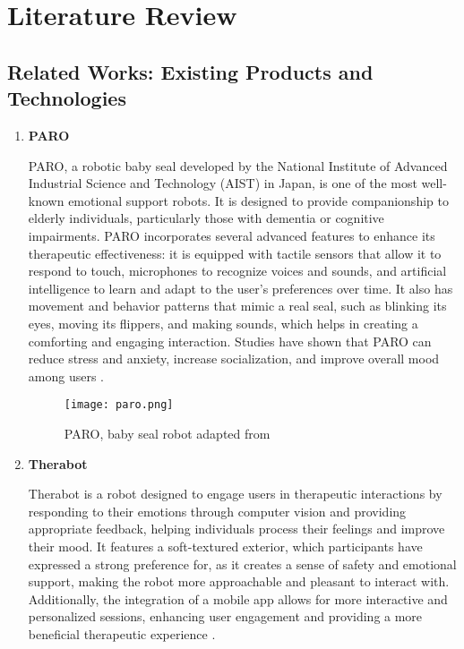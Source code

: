 \section{Literature Review}

\subsection{Related Works: Existing Products and Technologies}

\begin{enumerate}


\item{\bf{PARO}}
\vspace{0.25cm}

PARO, a robotic baby seal developed by the National Institute of Advanced Industrial Science and Technology (AIST) in Japan, is one of the most well-known emotional support robots. It is designed to provide companionship to elderly individuals, particularly those with dementia or cognitive impairments. PARO incorporates several advanced features to enhance its therapeutic effectiveness: it is equipped with tactile sensors that allow it to respond to touch, microphones to recognize voices and sounds, and artificial intelligence to learn and adapt to the user’s preferences over time. It also has movement and behavior patterns that mimic a real seal, such as blinking its eyes, moving its flippers, and making sounds, which helps in creating a comforting and engaging interaction. Studies have shown that PARO can reduce stress and anxiety, increase socialization, and improve overall mood among users \cite{wada2006}.

\begin{figure}[ht]
    \centering
    \texttt{[image: paro.png]}
    \caption{PARO, baby seal robot adapted from \cite{shibata2021}}
    \label{fig:paro}
\end{figure}

\item{\bf{Therabot}}
\vspace{0.25cm}

Therabot is a robot designed to engage users in therapeutic interactions by responding to their emotions through computer vision and providing appropriate feedback, helping individuals process their feelings and improve their mood. It features a soft-textured exterior, which participants have expressed a strong preference for, as it creates a sense of safety and emotional support, making the robot more approachable and pleasant to interact with. Additionally, the integration of a mobile app allows for more interactive and personalized sessions, enhancing user engagement and providing a more beneficial therapeutic experience \cite{bethel2018}.


\end{enumerate}
